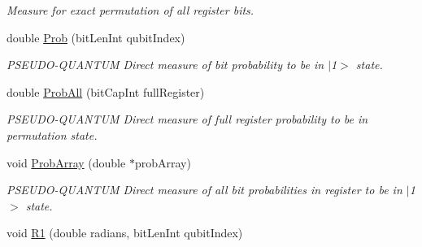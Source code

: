 \begin{DoxyCompactItemize}
\begin{DoxyCompactList}\small\item\em Measure for exact permutation of all register bits. \end{DoxyCompactList}\item 
double \hyperlink{classQrack_1_1Register_a974a551de48f59ac5de8ef3fe10b17f3}{Prob} (bit\+Len\+Int qubit\+Index)\hypertarget{classQrack_1_1Register_a974a551de48f59ac5de8ef3fe10b17f3}{}\label{classQrack_1_1Register_a974a551de48f59ac5de8ef3fe10b17f3}

\begin{DoxyCompactList}\small\item\em P\+S\+E\+U\+D\+O-\/\+Q\+U\+A\+N\+T\+UM Direct measure of bit probability to be in $\vert$1$>$ state. \end{DoxyCompactList}\item 
double \hyperlink{classQrack_1_1Register_a79024fbac5540534b273889127792e8b}{Prob\+All} (bit\+Cap\+Int full\+Register)\hypertarget{classQrack_1_1Register_a79024fbac5540534b273889127792e8b}{}\label{classQrack_1_1Register_a79024fbac5540534b273889127792e8b}

\begin{DoxyCompactList}\small\item\em P\+S\+E\+U\+D\+O-\/\+Q\+U\+A\+N\+T\+UM Direct measure of full register probability to be in permutation state. \end{DoxyCompactList}\item 
void \hyperlink{classQrack_1_1Register_ad9e026107fd3ae829caa6fc29a106911}{Prob\+Array} (double $\ast$prob\+Array)\hypertarget{classQrack_1_1Register_ad9e026107fd3ae829caa6fc29a106911}{}\label{classQrack_1_1Register_ad9e026107fd3ae829caa6fc29a106911}

\begin{DoxyCompactList}\small\item\em P\+S\+E\+U\+D\+O-\/\+Q\+U\+A\+N\+T\+UM Direct measure of all bit probabilities in register to be in $\vert$1$>$ state. \end{DoxyCompactList}\item 
void \hyperlink{classQrack_1_1Register_af3282e8368cbf01d1d2326da0db28c0e}{R1} (double radians, bit\+Len\+Int qubit\+Index)\hypertarget{classQrack_1_1Register_af3282e8368cbf01d1d2326da0db28c0e}{}\label{classQrack_1_1Register_af3282e8368cbf01d1d2326da0db28c0e}


\end{DoxyCompactItemize}
